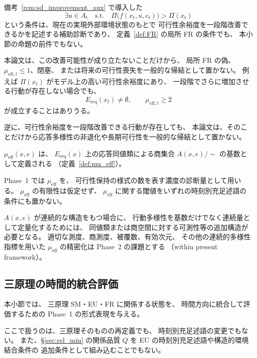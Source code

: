 \begin{remark}[可行性余裕度の改善可能性は補助診断である]
\label{rem:sd1_unfulfilled}
備考~\ref{rem:sd_improvement_aux} で導入した
\[
  \exists u\in A_t
  \quad\text{s.t.}\quad
  \Pi\bigl(f(x_t,u,e_t)\bigr)>\Pi(x_t)
\]
という条件は、現在の実現外部環境状態のもとで
可行性余裕度を一段階改善できるかを記述する補助診断であり、
定義~\ref{def:FR} の局所 FR の条件でも、
本小節の命題の前件でもない。

本論文は、この改善可能性が成り立たないことだけから、
局所 FR の偽、$\mu_{\mathrm{eff},t}\le1$、閉塞、
または将来の可行性喪失を一般的な帰結として置かない。
例えば $\Pi(x_t)$ がモデル上の高い可行性余裕度にあり、
一段階でさらに増加させる行動が存在しない場合でも、
\[
  E_{\mathrm{req}}(x_t)\neq\emptyset,
  \qquad
  \mu_{\mathrm{eff},t}\ge2
\]
が成立することはありうる。

逆に、可行性余裕度を一段階改善できる行動が存在しても、
本論文は、そのことだけから応答多様性の非退化や長期可行性を一般的な帰結として置かない。
\end{remark}

\begin{remark}
\label{rem:mu_measure}
$\mu_{\mathrm{eff}}(x,e)$ は、
$E_{\mathrm{req}}(x)$ 上の応答同値類による商集合
$A(x,e)/\!\sim$ の基数として定義される
（定義~\ref{def:mu_eff}）。

Phase~1 では $\mu_{\mathrm{eff}}$ を、
可行性保持の様式の数を表す濃度の診断量として用いる。
$\mu_{\mathrm{eff}}$ の有限性は仮定せず、
$\mu_{\mathrm{eff}}$ に関する閾値をいずれの時刻別充足述語の条件にも置かない。

$A(x,e)$ が連続的な構造をもつ場合に、
行動多様性を基数だけでなく連続量として定量化するためには、
同値類または商空間に対する可測性等の追加構造が必要となる。
適切な測度、商測度、被覆数、有効次元、
その他の連続的多様性指標を用いた
$\mu_{\mathrm{eff}}$ の精密化は Phase~2 の課題とする
（within present framework）。
\end{remark}

\subsection{三原理の時間的統合評価}
\label{subsec:s3_tstab}

本小節では、
三原理 SM・EU・FR に関係する状態を、
時間方向に統合して評価するための
Phase~1 の形式表現を与える。

ここで扱うのは、三原理そのものの再定義でも、
時刻別充足述語の変更でもない。
また、\S\ref{sec:rel_min} の関係品質 $Q$ を
EU の時刻別充足述語や構造的環境結合条件の
追加条件として組み込むことでもない。

